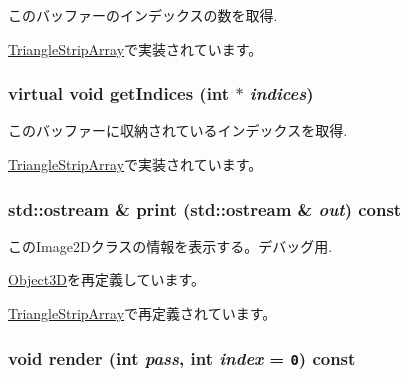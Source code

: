このバッファーのインデックスの数を取得. 

\hyperlink{classm3g_1_1TriangleStripArray_fe9ae2993ebcdb93d5ff26d57c81b73e}{TriangleStripArray}で実装されています。\hypertarget{classm3g_1_1IndexBuffer_59fb1eca8810ea3b028735c5dce53fca}{
\subsubsection[{getIndices}]{\setlength{\rightskip}{0pt plus 5cm}virtual void getIndices (int $\ast$ {\em indices})}}
\label{classm3g_1_1IndexBuffer_59fb1eca8810ea3b028735c5dce53fca}


このバッファーに収納されているインデックスを取得. 

\hyperlink{classm3g_1_1TriangleStripArray_650953afac45099025a524ab160b911f}{TriangleStripArray}で実装されています。\hypertarget{classm3g_1_1IndexBuffer_6fea17fa1532df3794f8cb39cb4f911f}{
\subsubsection[{print}]{\setlength{\rightskip}{0pt plus 5cm}std::ostream \& print (std::ostream \& {\em out}) const}}
\label{classm3g_1_1IndexBuffer_6fea17fa1532df3794f8cb39cb4f911f}


このImage2Dクラスの情報を表示する。デバッグ用. 

\hyperlink{classm3g_1_1Object3D_6fea17fa1532df3794f8cb39cb4f911f}{Object3D}を再定義しています。

\hyperlink{classm3g_1_1TriangleStripArray_6fea17fa1532df3794f8cb39cb4f911f}{TriangleStripArray}で再定義されています。\hypertarget{classm3g_1_1IndexBuffer_1efcb1973989d9963d5bd6d03065d389}{
\subsubsection[{render}]{\setlength{\rightskip}{0pt plus 5cm}void render (int {\em pass}, \/  int {\em index} = {\tt 0}) const}}
\label{classm3g_1_1IndexBuffer_1efcb1973989d9963d5bd6d03065d389}


